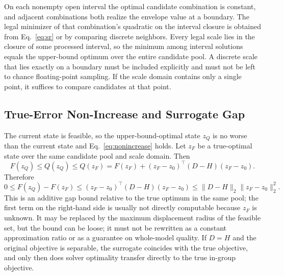 On each nonempty open interval the optimal candidate combination is constant, and adjacent combinations both realize the envelope value at a boundary.
The legal minimizer of that combination's quadratic on the interval closure is obtained from Eq.~\eqref{eq:sr} or by comparing discrete neighbors.
Every legal scale lies in the closure of some processed interval, so the minimum among interval solutions equals the upper-bound optimum over the entire candidate pool.
A discrete scale that lies exactly on a boundary must be included explicitly and must not be left to chance floating-point sampling.
If the scale domain contains only a single point, it suffices to compare candidates at that point.

\subsection{True-Error Non-Increase and Surrogate Gap}

The current state is feasible, so the upper-bound-optimal state $z_Q$ is no worse than the current state and Eq.~\eqref{eq:nonincrease} holds.
Let $z_F$ be a true-optimal state over the same candidate pool and scale domain. Then
\begin{equation}
F(z_Q)\le Q(z_Q)\le Q(z_F)
=F(z_F)+(z_F-z_0)^\top(D-H)(z_F-z_0).
\label{eq:QF}
\end{equation}
Therefore
\begin{equation}
0\le F(z_Q)-F(z_F)
\le(z_F-z_0)^\top(D-H)(z_F-z_0)
\le\|D-H\|_2\|z_F-z_0\|_2^2.
\label{eq:gap_bound}
\end{equation}
This is an additive gap bound relative to the true optimum in the same pool; the first term on the right-hand side is usually not directly computable because $z_F$ is unknown.
It may be replaced by the maximum displacement radius of the feasible set, but the bound can be loose; it must not be rewritten as a constant approximation ratio or as a guarantee on whole-model quality.
If $D=H$ and the original objective is separable, the surrogate coincides with the true objective, and only then does solver optimality transfer directly to the true in-group objective.


